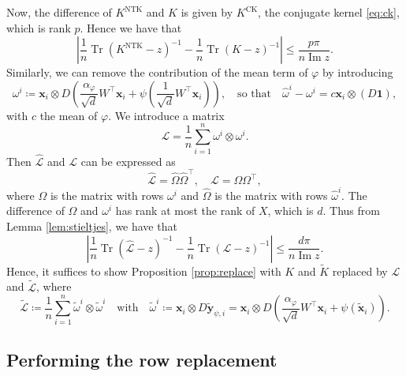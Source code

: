 \documentclass[letterpaper, 10pt, dvipsnames]{article}
\numberwithin{equation}{section}
\renewcommand{\Im}{\operatorname{Im}}
\DeclareMathOperator{\Tr}{Tr}
\newcommand{\tr}{\Tr}
\newcommand{\x}{\mathbf{x}}
\newcommand{\y}{\mathbf{y}}
\renewcommand{\phi}{\varphi}
\newcommand{\wt}{\widetilde}
\theoremstyle{definition}
\begin{document}
Now, the difference of $K^{\mathrm{NTK}}$ and $K$ is given by $K^{\mathrm{CK}}$, the conjugate kernel \eqref{eq:ck}, which is rank $p$.  Hence we have that
\[
\left|\frac{1}{n}\tr(K^{\mathrm{NTK}}-z)^{-1} - \frac{1}{n}\tr(K-z)^{-1}\right| 
\leq  \frac{p \pi}{n \Im z}.
\]
Similarly, we can remove the contribution of the mean term of $\varphi$ by introducing 
\[
{\omega}^i \coloneqq \x_i \otimes D\left(\frac{\alpha_\phi}{\sqrt{d}}W^\top \x_i + \psi\left( \frac{1}{\sqrt{d}}W^\top \x_i\right)\right),
\quad\text{so that}\quad
\widehat{\omega}^i - {\omega}^i = c \x_i \otimes (D \mathbf{1}),
\]
with $c$ the mean of $\varphi$.
We introduce a matrix 
\[
\mathcal{L} = \frac{1}{n} \sum_{i=1}^n {\omega}^i\otimes{\omega}^i.
\]
Then $\widehat{\mathcal{L}}$ and $\mathcal{L}$ can be expressed as 
\[
\widehat{\mathcal{L}} = \widehat{\Omega}\widehat{\Omega}^\top, \quad \mathcal{L} = {\Omega}{\Omega}^\top,
\]
where ${\Omega}$ is the matrix with rows ${\omega}^i$ and $\widehat{\Omega}$ is the matrix with rows $\widehat{\omega}^i$.  The difference of ${\Omega}$ and ${\omega}^i$ has rank at most the rank of $X$, which is $d$. Thus from Lemma \ref{lem:stieltjes}, we have that 
\[
\left|\frac{1}{n}\tr(\widehat{\mathcal{L}}-z)^{-1} - \frac{1}{n}\tr(\mathcal{L}-z)^{-1}\right| 
\leq  \frac{d \pi}{n \Im z}.
\]
Hence, it suffices to show Proposition \ref{prop:replace} with $K$ and $\widetilde{K}$ replaced by $\mathcal{L}$ and $\widetilde{\mathcal{L}}$, where 
\[
\widetilde{\mathcal{L}} \coloneqq \frac{1}{n} \sum_{i=1}^n \widetilde{\omega}^i\otimes\widetilde{\omega}^i
\quad\text{with}\quad
\wt{\omega}^i \coloneqq \x_i \otimes D\wt{\y}_{\psi,i}
=
 \x_i \otimes D\left(
    \frac{\alpha_\phi}{\sqrt{d}}W^\top \x_i + \psi\left(\wt{\x}_i\right)
    \right).
\]

\subsection*{Performing the row replacement}
\end{document}
